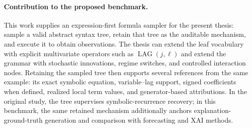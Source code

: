 \paragraph{Contribution to the proposed benchmark.}
This work supplies an expression-first formula sampler for the present thesis:
sample a valid abstract syntax tree, retain that tree as the auditable
mechanism, and execute it to obtain observations. The thesis can extend the
leaf vocabulary with explicit multivariate operators such as
$\operatorname{LAG}(j,\ell)$ and extend the grammar with stochastic
innovations, regime switches, and controlled interaction nodes. Retaining the
sampled tree then supports several references from the same example: its exact
symbolic equation, variable--lag support, signed coefficients when defined,
realized local term values, and generator-based attributions. In the original
study, the tree supervises symbolic-recurrence recovery; in this benchmark, the
same retained mechanism additionally anchors explanation-ground-truth
generation and comparison with forecasting and XAI methods.

